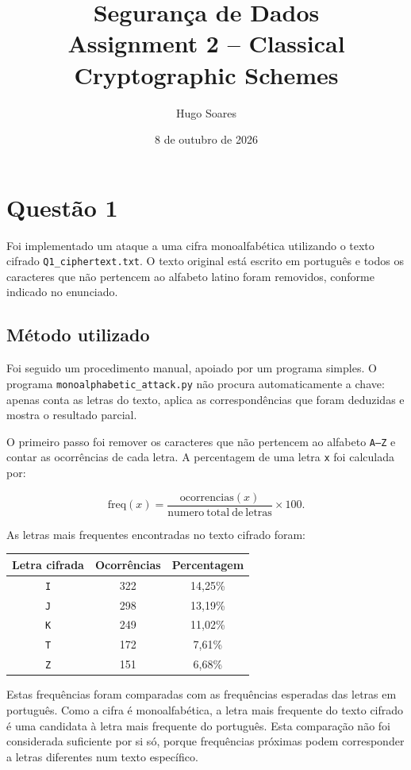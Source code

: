 \documentclass[11pt,a4paper]{article}
\title{Segurança de Dados\\\large Assignment 2 -- Classical Cryptographic Schemes}
\author{Hugo Soares}
\date{8 de outubro de 2026}
\begin{document}
\maketitle

\section*{Questão 1}

Foi implementado um ataque a uma cifra monoalfabética utilizando o texto cifrado
\texttt{Q1\_ciphertext.txt}. O texto original está escrito em português e todos os
caracteres que não pertencem ao alfabeto latino foram removidos, conforme indicado
no enunciado.

\subsection*{Método utilizado}

Foi seguido um procedimento manual, apoiado por um programa simples. O
programa \texttt{monoalphabetic\_attack.py} não procura automaticamente a
chave: apenas conta as letras do texto, aplica as correspondências que foram
deduzidas e mostra o resultado parcial.

O primeiro passo foi remover os caracteres que não pertencem ao alfabeto
\texttt{A--Z} e contar as ocorrências de cada letra. A percentagem de uma letra
\texttt{x} foi calculada por:

\[
\mathrm{freq}(x) =
\frac{\mathrm{ocorrencias}(x)}
{\mathrm{numero\ total\ de\ letras}}\times 100.
\]

As letras mais frequentes encontradas no texto cifrado foram:

\begin{center}
\begin{tabular}{c|c|c}
\textbf{Letra cifrada} & \textbf{Ocorrências} & \textbf{Percentagem}\\
\midrule
\texttt{I} & 322 & 14,25\%\\
\texttt{J} & 298 & 13,19\%\\
\texttt{K} & 249 & 11,02\%\\
\texttt{T} & 172 & 7,61\%\\
\texttt{Z} & 151 & 6,68\%\\
\end{tabular}
\end{center}

Estas frequências foram comparadas com as frequências esperadas das letras em
português. Como a cifra é monoalfabética, a letra mais frequente do texto
cifrado é uma candidata à letra mais frequente do português. Esta comparação
não foi considerada suficiente por si só, porque frequências próximas podem
corresponder a letras diferentes num texto específico.
\end{document}
